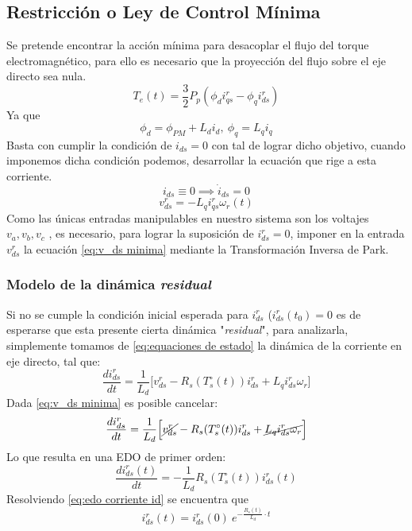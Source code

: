 
\subsection{Restricción o Ley de Control Mínima}
Se pretende encontrar la acción mínima para desacoplar el flujo del torque electromagnético, para ello es necesario que la proyección del flujo sobre el eje directo sea nula.
\begin{equation*}
    T_e(t) = \frac{3}{2}P_p(\phi_di_{qs}^r-\phi_qi_{ds}^r)
\end{equation*}
Ya que \[\phi_d = \phi_{PM} +L_di_d, \ \phi_q = L_qi_q\]
Basta con cumplir la condición de \(i_{ds} = 0\) con tal de lograr dicho objetivo, cuando imponemos dicha condición podemos, desarrollar la ecuación que rige a esta corriente.
\[i_{ds} \equiv 0 \implies \dot i_{ds} = 0 \]
\begin{equation}\label{eq:v_ds minima}
    v_{ds}^r= - L_qi_{qs}^r\omega_r(t)
\end{equation}
Como las únicas entradas manipulables en nuestro sistema son los voltajes \(v_a, v_b,v_c\) , es necesario, para lograr la suposición de \(i_{ds}^r=0\), imponer en la entrada \(v_{ds}^r\) la ecuación \ref{eq:v_ds minima} mediante la Transformación Inversa de Park.

\subsubsection{Modelo de la dinámica \textit{residual}}
Si no se cumple la condición inicial esperada para \(i_{ds}^r \) (\(i_{ds}^r(t_0) = 0\) es de esperarse que esta presente cierta dinámica "\textit{residual}", para analizarla, simplemente tomamos de \eqref{eq:equaciones de estado} la dinámica de la corriente en eje directo, tal que:
\begin{equation}\label{eq:corriente id}
    \frac{di_{ds}^r}{dt} = \frac{1}{L_d}\Big[v_{ds}^r - R_s(T_s^\circ(t))i_{ds}^r+L_qi_{ds}^r\omega_r\Big]
\end{equation}
Dada \eqref{eq:v_ds minima} es posible cancelar:
    \[\frac{di_{ds}^r}{dt} = \frac{1}{L_d}\Big[\cancel{v_{ds}^r} - R_s(T_s^\circ(t))i_{ds}^r+ \cancel{L_qi_{ds}^r\omega_r}\Big]\]
Lo que resulta en una EDO de primer orden:
    \begin{equation}\label{eq:edo corriente id}
        \frac{di_{ds}^r(t)}{dt} = -\frac{1}{L_d} R_s(T_s^\circ(t))i_{ds}^r(t)
    \end{equation}
Resolviendo \eqref{eq:edo corriente id} se encuentra que \[ i_{ds}^r(t) = i_{ds}^r(0) \ e^{-\frac{R_s(t)}{L_d}\cdot t}\]

